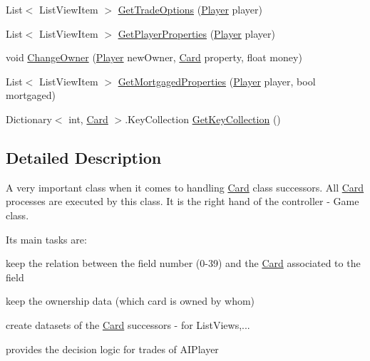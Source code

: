 \begin{DoxyCompactItemize}
\item 
List$<$ List\+View\+Item $>$ \mbox{\hyperlink{class_monopoly_1_1_cards_1_1_property_manager_a3e4394937f2067145c8b86addba32c4d}{Get\+Trade\+Options}} (\mbox{\hyperlink{class_monopoly_1_1_players_1_1_player}{Player}} player)
\item 
List$<$ List\+View\+Item $>$ \mbox{\hyperlink{class_monopoly_1_1_cards_1_1_property_manager_af1da8a20a41d714ed1eed632c55c26b3}{Get\+Player\+Properties}} (\mbox{\hyperlink{class_monopoly_1_1_players_1_1_player}{Player}} player)
\item 
void \mbox{\hyperlink{class_monopoly_1_1_cards_1_1_property_manager_ab5ff75e9b6f073e75774f6e9c2948d27}{Change\+Owner}} (\mbox{\hyperlink{class_monopoly_1_1_players_1_1_player}{Player}} new\+Owner, \mbox{\hyperlink{class_monopoly_1_1_cards_1_1_card}{Card}} property, float money)
\item 
List$<$ List\+View\+Item $>$ \mbox{\hyperlink{class_monopoly_1_1_cards_1_1_property_manager_a1ccab2c415aac585d65e6e3cae272474}{Get\+Mortgaged\+Properties}} (\mbox{\hyperlink{class_monopoly_1_1_players_1_1_player}{Player}} player, bool mortgaged)
\item 
Dictionary$<$ int, \mbox{\hyperlink{class_monopoly_1_1_cards_1_1_card}{Card}} $>$.Key\+Collection \mbox{\hyperlink{class_monopoly_1_1_cards_1_1_property_manager_a6ee73c066851e81c0f9af200e6f0fb3f}{Get\+Key\+Collection}} ()
\end{DoxyCompactItemize}


\subsection{Detailed Description}
A very important class when it comes to handling \mbox{\hyperlink{class_monopoly_1_1_cards_1_1_card}{Card}} class\textquotesingle{} successors. All \mbox{\hyperlink{class_monopoly_1_1_cards_1_1_card}{Card}} processes are executed by this class. It is \textquotesingle{}the right hand\textquotesingle{} of the controller -\/ Game class.

It\textquotesingle{}s main tasks are\+:
\begin{DoxyItemize}
\item keep the relation between the field number (0-\/39) and the \mbox{\hyperlink{class_monopoly_1_1_cards_1_1_card}{Card}} associated to the field
\item keep the ownership data (which card is owned by whom)
\item create datasets of the \mbox{\hyperlink{class_monopoly_1_1_cards_1_1_card}{Card}} successors -\/ for List\+Views,...
\item provides the decision logic for trades of A\+I\+Player 
\end{DoxyItemize}

